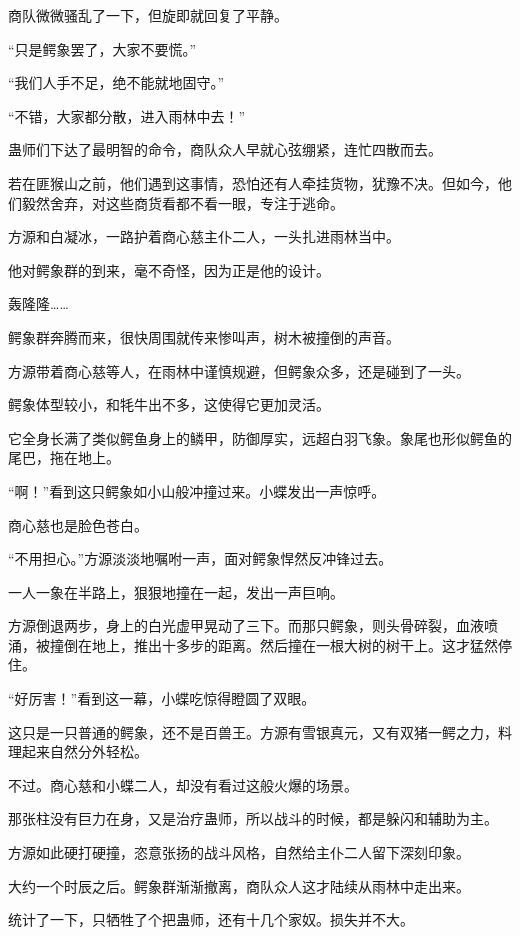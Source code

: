 \begin{this_body}
商队微微骚乱了一下，但旋即就回复了平静。

“只是鳄象罢了，大家不要慌。”

“我们人手不足，绝不能就地固守。”

“不错，大家都分散，进入雨林中去！”

蛊师们下达了最明智的命令，商队众人早就心弦绷紧，连忙四散而去。

若在匪猴山之前，他们遇到这事情，恐怕还有人牵挂货物，犹豫不决。但如今，他们毅然舍弃，对这些商货看都不看一眼，专注于逃命。

方源和白凝冰，一路护着商心慈主仆二人，一头扎进雨林当中。

他对鳄象群的到来，毫不奇怪，因为正是他的设计。

轰隆隆……

鳄象群奔腾而来，很快周围就传来惨叫声，树木被撞倒的声音。

方源带着商心慈等人，在雨林中谨慎规避，但鳄象众多，还是碰到了一头。

鳄象体型较小，和牦牛出不多，这使得它更加灵活。

它全身长满了类似鳄鱼身上的鳞甲，防御厚实，远超白羽飞象。象尾也形似鳄鱼的尾巴，拖在地上。

“啊！”看到这只鳄象如小山般冲撞过来。小蝶发出一声惊呼。

商心慈也是脸色苍白。

“不用担心。”方源淡淡地嘱咐一声，面对鳄象悍然反冲锋过去。

一人一象在半路上，狠狠地撞在一起，发出一声巨响。

方源倒退两步，身上的白光虚甲晃动了三下。而那只鳄象，则头骨碎裂，血液喷涌，被撞倒在地上，推出十多步的距离。然后撞在一根大树的树干上。这才猛然停住。

“好厉害！”看到这一幕，小蝶吃惊得瞪圆了双眼。

这只是一只普通的鳄象，还不是百兽王。方源有雪银真元，又有双猪一鳄之力，料理起来自然分外轻松。

不过。商心慈和小蝶二人，却没有看过这般火爆的场景。

那张柱没有巨力在身，又是治疗蛊师，所以战斗的时候，都是躲闪和辅助为主。

方源如此硬打硬撞，恣意张扬的战斗风格，自然给主仆二人留下深刻印象。

大约一个时辰之后。鳄象群渐渐撤离，商队众人这才陆续从雨林中走出来。

统计了一下，只牺牲了个把蛊师，还有十几个家奴。损失并不大。


\end{this_body}
